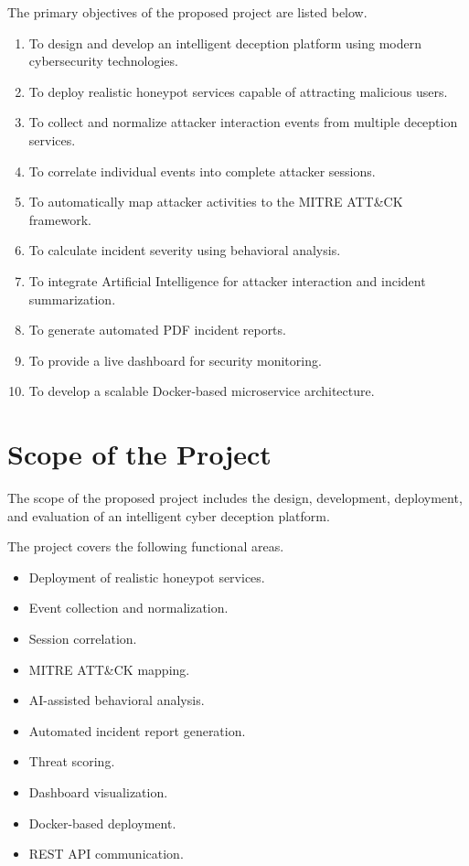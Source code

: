 \documentclass[12pt,a4paper]{report}
\begin{document}
The primary objectives of the proposed project are listed below.

\begin{enumerate}
\item To design and develop an intelligent deception platform using modern cybersecurity technologies.
\item To deploy realistic honeypot services capable of attracting malicious users.
\item To collect and normalize attacker interaction events from multiple deception services.
\item To correlate individual events into complete attacker sessions.
\item To automatically map attacker activities to the MITRE ATT\&CK framework.
\item To calculate incident severity using behavioral analysis.
\item To integrate Artificial Intelligence for attacker interaction and incident summarization.
\item To generate automated PDF incident reports.
\item To provide a live dashboard for security monitoring.
\item To develop a scalable Docker-based microservice architecture.
\end{enumerate}


\chapter{Scope of the Project}

The scope of the proposed project includes the design, development, deployment, and evaluation of an intelligent cyber deception platform.

The project covers the following functional areas.

\begin{itemize}
\item Deployment of realistic honeypot services.
\item Event collection and normalization.
\item Session correlation.
\item MITRE ATT\&CK mapping.
\item AI-assisted behavioral analysis.
\item Automated incident report generation.
\item Threat scoring.
\item Dashboard visualization.
\item Docker-based deployment.
\item REST API communication.
\end{itemize}
\end{document}
